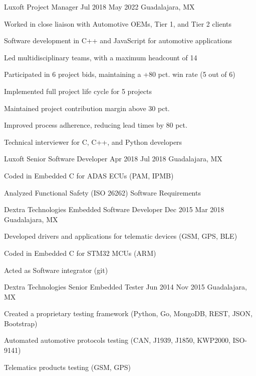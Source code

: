 \documentclass{resume} %
\begin{document}
\job
    {Luxoft}
    {Project Manager}
    {Jul 2018}
    {May 2022}
    {Guadalajara, MX}
    {
    \begin{itemize-bullets}
    \item{Worked in close liaison with Automotive OEMs, Tier 1, and Tier 2 clients}
    \item{Software development in C++ and JavaScript for automotive applications}
    \item{Led multidisciplinary teams, with a maximum headcount of 14}
    \item{Participated in 6 project bids, maintaining a +80 pct. win rate (5 out of 6)}
    \item{Implemented full project life cycle for 5 projects}
    \item{Maintained project contribution margin above 30 pct.}
    \item{Improved process adherence, reducing lead times by 80 pct.}
    \item{Technical interviewer for C, C++, and Python developers}
    \end{itemize-bullets}
    }


\job
    {Luxoft}
    {Senior Software Developer}
    {Apr 2018}
    {Jul 2018}
    {Guadalajara, MX}
    {
    \begin{itemize-bullets}
    \item{Coded in Embedded C for ADAS ECUs (PAM, IPMB)}
    \item{Analyzed Functional Safety (ISO 26262) Software Requirements}
    \end{itemize-bullets}
    }


\job
    {Dextra Technologies}
    {Embedded Software Developer}
    {Dec 2015}
    {Mar 2018}
    {Guadalajara, MX}
    {
    \begin{itemize-bullets}
    \item{Developed drivers and applications for telematic devices (GSM, GPS, BLE)}
    \item{Coded in Embedded C for STM32 MCUs (ARM)}
    \item{Acted as Software integrator (git)}
    \end{itemize-bullets}
    }


\job
    {Dextra Technologies}
    {Senior Embedded Tester}
    {Jun 2014}
    {Nov 2015}
    {Guadalajara, MX}
    {
    \begin{itemize-bullets}
    \item{Created a proprietary testing framework (Python, Go, MongoDB, REST, JSON, Bootstrap)}
    \item{Automated automotive protocols testing (CAN, J1939, J1850, KWP2000, ISO-9141)}
    \item{Telematics products testing (GSM, GPS)}
    \end{itemize-bullets}
    }
\end{document}
